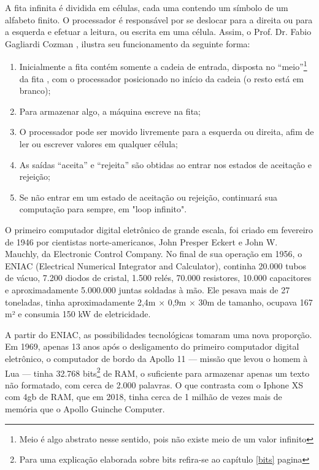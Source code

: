 A fita infinita é dividida em células, cada uma contendo um símbolo de um alfabeto finito. O processador é responsável por se deslocar para a direita ou para a esquerda e efetuar a leitura, ou escrita em uma célula. Assim, o Prof. Dr. Fabio Gagliardi Cozman \cite{7}, ilustra seu funcionamento da seguinte forma:
\begin{enumerate}
  \item Inicialmente a fita contém somente a cadeia de entrada, disposta no ``meio''\footnote{Meio é algo abstrato nesse sentido, pois não existe meio de um valor infinito} da fita , com o processador posicionado no início da cadeia (o resto está em branco);
  \item Para armazenar algo, a máquina escreve na fita;
  \item O processador pode ser movido livremente para a esquerda ou direita, afim de ler ou escrever valores em qualquer célula;
  \item As saídas ``aceita'' e ``rejeita'' são obtidas ao entrar nos estados de aceitação e rejeição;
  \item Se não entrar em um estado de aceitação ou rejeição, continuará sua computação para sempre, em "loop infinito".
\end{enumerate}

O primeiro computador digital eletrônico de grande escala, foi criado em fevereiro de 1946 por cientistas norte-americanos, John Presper Eckert e John W. Mauchly, da Electronic Control Company. No final de sua operação em 1956, o ENIAC (Electrical Numerical Integrator and Calculator), continha 20.000 tubos de vácuo, 7.200 diodos de cristal, 1.500 relés, 70.000 resistores, 10.000 capacitores e aproximadamente 5.000.000 juntas soldadas à mão. Ele pesava mais de 27 toneladas, tinha aproximadamente 2,4m × 0,9m × 30m de tamanho, ocupava 167 m² e consumia 150 kW de eletricidade. \cite{2}

A partir do ENIAC, as possibilidades tecnológicas tomaram uma nova proporção. Em 1969, apenas 13 anos após o desligamento do primeiro computador digital eletrônico, o computador de bordo da Apollo 11 — missão que levou o homem  à Lua — tinha 32.768 bits\footnote{Para uma explicação elaborada sobre bits refira-se ao capítulo \ref{bits} pagina \pageref{bits}} de RAM, o suficiente para armazenar apenas um texto não formatado, com cerca de 2.000 palavras. O que contrasta com o Iphone XS com 4gb de RAM, que em 2018, tinha cerca de 1 milhão de vezes mais de memória que o Apollo Guinche Computer. \cite{5}

